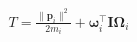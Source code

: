 \documentclass[preview]{standalone}
\begin{document}
\begin{align*}
T = \frac{\|\mathbf p_i\|^2}{2m_i} + \mathbf{\omega}_i^\top\mathbf{I}\mathbf{\Omega}_i
\end{align*}
\end{document}
